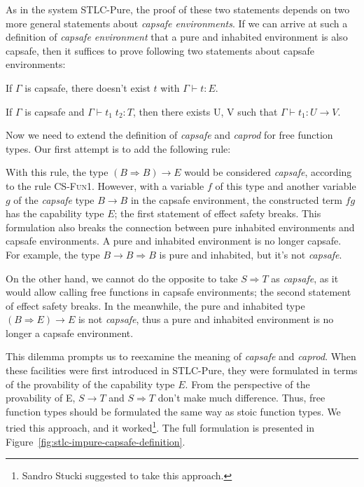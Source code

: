 As in the system STLC-Pure, the proof of these two statements depends
on two more general statements about \emph{capsafe environments}. If
we can arrive at such a definition of \emph{capsafe environment} that
a pure and inhabited environment is also capsafe, then it suffices to
prove following two statements about capsafe environments:

\begin{definition}
  If $\Gamma$ is capsafe, there doesn't exist $t$ with
  $\Gamma \vdash t : E$.
\end{definition}

\begin{definition}
  If $\Gamma$ is capsafe and $\Gamma \vdash t_1 \; t_2 : T$, then
  there exists U, V such that $\Gamma \vdash t_1 : U \to V$.
\end{definition}

Now we need to extend the definition of \emph{capsafe} and
\emph{caprod} for free function types. Our first attempt is to add
the following rule:


With this rule, the type $(B \Rightarrow B) \to E$ would be considered
\emph{capsafe}, according to the rule \textsc{CS-Fun1}. However, with
a variable $f$ of this type and another variable $g$ of the
\emph{capsafe} type $B \to B$ in the capsafe environment, the
constructed term $f g$ has the capability type $E$; the first
statement of effect safety breaks. This formulation also breaks the
connection between pure inhabited environments and capsafe
environments. A pure and inhabited environment is no longer
capsafe. For example, the type $B \to B \Rightarrow B$ is pure and
inhabited, but it's not \emph{capsafe}.

On the other hand, we cannot do the opposite to take $S \Rightarrow T$
as \emph{capsafe}, as it would allow calling free functions in capsafe
environments; the second statement of effect safety breaks. In the
meanwhile, the pure and inhabited type $(B \Rightarrow E) \to E$ is
not \emph{capsafe}, thus a pure and inhabited environment is no longer
a capsafe environment.

This dilemma prompts us to reexamine the meaning of \emph{capsafe} and
\emph{caprod}. When these facilities were first introduced in
STLC-Pure, they were formulated in terms of the provability of the
capability type $E$. From the perspective of the provability of E,
$S \to T$ and $S \Rightarrow T$ don't make much difference. Thus, free
function types should be formulated the same way as stoic function
types. We tried this approach, and it worked\footnote{Sandro Stucki
  suggested to take this approach.}. The full formulation is presented
in Figure~\ref{fig:stlc-impure-capsafe-definition}.

